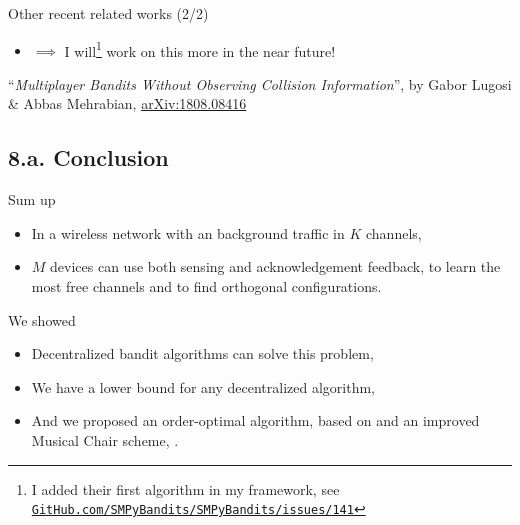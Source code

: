 \documentclass[12pt,english,ignorenonframetext,aspectratio=169,]{beamer}
\providecommand{\tightlist}{%
  \setlength{\itemsep}{0pt}\setlength{\parskip}{0pt}}
\begin{document}
\begin{frame}{Other recent related works (2/2)}
\begin{itemize}
\pause
\item
$\implies$ I will\footnote{\tiny I added their first algorithm in my framework, see \href{https://github.com/SMPyBandits/SMPyBandits/issues/141}{\texttt{GitHub.com/SMPyBandits/SMPyBandits/issues/141}}}
work on this more in the near future!

\end{itemize}

\vfill{}
\begin{footnotesize}
  ``\emph{Multiplayer Bandits Without Observing Collision Information}'',
  by Gabor Lugosi \& Abbas Mehrabian,
  \textcolor{blue}{\href{https://arxiv.org/abs/1808.08416}{arXiv:1808.08416}}
\end{footnotesize}

\end{frame}


\subsection{\hfill{}8.a. Conclusion\hfill{}}

\begin{frame}{Sum up}

\begin{itemize}\tightlist
\item
  In a wireless network with an \iid{} background traffic in \(K\)
  channels,
\item
  \(M\) devices can use both sensing and acknowledgement feedback, to
  learn the most free channels and to find orthogonal configurations.
\end{itemize}

\pause

\begin{block}{We showed}

\begin{itemize}\tightlist
\item
  Decentralized bandit algorithms can solve this problem,
\item
  We have a lower bound for any decentralized algorithm,
\item
  And we proposed an order-optimal algorithm, based on \klUCB{} and an
  improved Musical Chair scheme, \MCTopM.
\end{itemize}

\end{block}

\end{frame}
\end{document}

